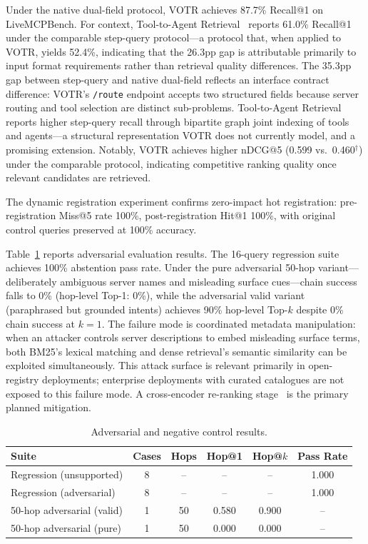 \documentclass[sigconf,anonymous,review]{acmart}
\newcommand{\votr}{\textsc{VOTR}\xspace}
\begin{document}
Under the native dual-field protocol, \votr achieves 87.7\% Recall@1 on
LiveMCPBench.
For context, Tool-to-Agent Retrieval~\cite{tool_to_agent_2025} reports 61.0\%
Recall@1 under the comparable step-query protocol---a protocol that, when applied
to \votr, yields 52.4\%, indicating that the 26.3pp gap is attributable primarily
to input format requirements rather than retrieval quality differences.
The 35.3pp gap between step-query and native dual-field reflects an interface
contract difference: \votr's \texttt{/route} endpoint accepts two structured fields
because server routing and tool selection are distinct sub-problems.
Tool-to-Agent Retrieval reports higher step-query recall through bipartite graph
joint indexing of tools and agents---a structural representation \votr does not
currently model, and a promising extension.
Notably, \votr achieves higher nDCG@5 (0.599 vs.\ 0.460$^\dagger$) under the
comparable protocol, indicating competitive ranking quality once relevant candidates
are retrieved.

The dynamic registration experiment confirms zero-impact hot registration:
pre-registration Miss@5 rate 100\%, post-registration Hit@1 100\%, with original
control queries preserved at 100\% accuracy.

Table~\ref{tab:adv} reports adversarial evaluation results.
The 16-query regression suite achieves 100\% abstention pass rate.
Under the pure adversarial 50-hop variant---deliberately ambiguous server names and
misleading surface cues---chain success falls to 0\% (hop-level Top-1: 0\%), while
the adversarial valid variant (paraphrased but grounded intents) achieves 90\%
hop-level Top-$k$ despite 0\% chain success at $k=1$.
The failure mode is coordinated metadata manipulation: when an attacker controls
server descriptions to embed misleading surface terms, both BM25's lexical matching
and dense retrieval's semantic similarity can be exploited simultaneously.
This attack surface is relevant primarily in open-registry deployments;
enterprise deployments with curated catalogues are not exposed to this failure mode.
A cross-encoder re-ranking stage~\cite{nogueira2019bert} is the primary planned
mitigation.

\begin{table}[t]
\centering
\scriptsize
\caption{Adversarial and negative control results.}
\label{tab:adv}
\begin{tabular}{@{}lccccc@{}}
\toprule
Suite & Cases & Hops & Hop@1 & Hop@$k$ & Pass Rate \\
\midrule
Regression (unsupported)      & 8 & --  & --    & --    & 1.000 \\
Regression (adversarial)      & 8 & --  & --    & --    & 1.000 \\
50-hop adversarial (valid)    & 1 & 50  & 0.580 & 0.900 & -- \\
50-hop adversarial (pure)     & 1 & 50  & 0.000 & 0.000 & -- \\
\bottomrule
\end{tabular}
\end{table}
\end{document}
